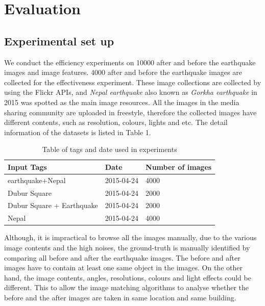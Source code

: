 \documentclass[runningheads,a4paper]{llncs}
\begin{document}
\pagebreak


\section{Evaluation} \label{sec-evaluation}
\subsection{Experimental set up}
We conduct the efficiency experiments on 10000 after and before the earthquake images and image features. 4000 after and before the earthquake images are collected for the effectiveness experiment. These image collections are collected by using the Flickr APIs, and \textit{Nepal earthquake} also known as \textit{Gorkha earthquake} in 2015 was spotted as the main image resources. All the images in the media sharing community are uploaded in freestyle, therefore the collected images have different contents, such as resolution, colours, lights and etc.  The detail information of the datasets is listed in Table 1.
\begin{table}
  \begin{tabular}{|p{3cm}|p{4cm}|p{4cm}|}
  \hline  {\bf Input Tags} & {\bf Date} & {\bf Number of images} \\ \hline
    earthquake+Nepal & 2015-04-24 &  4000\\ \hline
    Dubur Square &  2015-04-24 & 2000\\ \hline
    Dubur Square + Earthquake & 2015-04-24 & 2000\\ \hline
    Nepal &  2015-04-24 & 4000\\ \hline
  \end{tabular}
  \caption{Table of tags and date used in experiments }
\end{table}

Although, it is impractical to browse all the images manually, due to the various image contents and the high noises, the ground-truth is manually identified by comparing all before and after the earthquake images. The before and after images have to contain at least one same object in the images. On the other hand, the image contents, angles, resolutions, colours and light effects could be different. 
This to allow the image matching algorithms to analyse whether the before and the after images are taken in same location and same building. 
\end{document}
